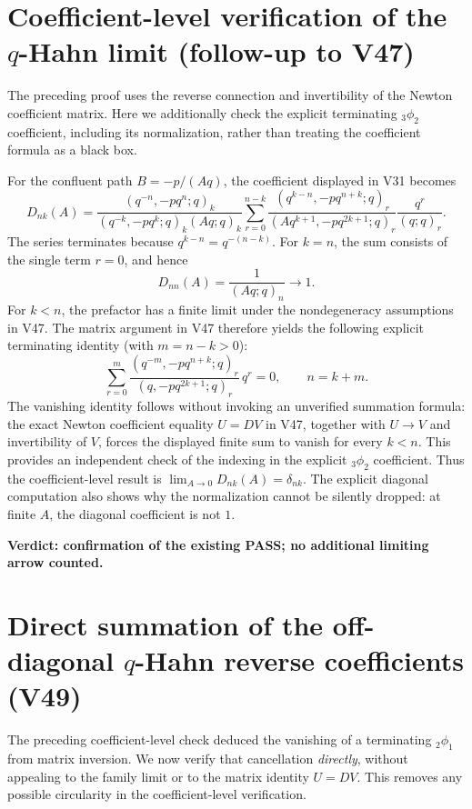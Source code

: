 \documentclass[11pt]{article}
\begin{document}
\section{Coefficient-level verification of the $q$-Hahn limit (follow-up to V47)}
The preceding proof uses the reverse connection and invertibility of the
Newton coefficient matrix. Here we additionally check the explicit
terminating ${}_3\phi_2$ coefficient, including its normalization, rather
than treating the coefficient formula as a black box.

For the confluent path $B=-p/(Aq)$, the coefficient displayed in V31 becomes
\[
D_{nk}(A)=\frac{(q^{-n},-pq^n;q)_k}
{(q^{-k},-pq^k;q)_k(Aq;q)_k}
\sum_{r=0}^{n-k}
\frac{(q^{k-n},-pq^{n+k};q)_r}
{(Aq^{k+1},-pq^{2k+1};q)_r}\frac{q^r}{(q;q)_r}.
\]
The series terminates because $q^{k-n}=q^{-(n-k)}$.
For $k=n$, the sum consists of the single term $r=0$, and hence
\[
\boxed{D_{nn}(A)=\frac1{(Aq;q)_n}\longrightarrow1.}
\]
For $k<n$, the prefactor has a finite limit under the nondegeneracy
assumptions in V47. The matrix argument in V47 therefore yields the
following explicit terminating identity (with $m=n-k>0$):
\[
\boxed{\sum_{r=0}^{m}
\frac{(q^{-m},-pq^{n+k};q)_r}
{(q,-pq^{2k+1};q)_r}\,q^r=0,\qquad n=k+m.}
\]
The vanishing identity follows without invoking an unverified
summation formula: the exact Newton coefficient equality $U=DV$ in V47,
together with $U\to V$ and invertibility of $V$, forces the displayed
finite sum to vanish for every $k<n$. This provides an independent
check of the indexing in the explicit ${}_3\phi_2$ coefficient.
Thus the coefficient-level result is $\lim_{A\to0}D_{nk}(A)=\delta_{nk}$.
The explicit diagonal computation also shows why the normalization cannot
be silently dropped: at finite $A$, the diagonal coefficient is not $1$.
\par\noindent\textbf{Verdict: confirmation of the existing PASS; no additional limiting arrow counted.}


\section{Direct summation of the off-diagonal $q$-Hahn reverse coefficients (V49)}
The preceding coefficient-level check deduced the vanishing of a terminating
${}_2\phi_1$ from matrix inversion. We now verify that cancellation
\emph{directly}, without appealing to the family limit or to the matrix
identity $U=DV$. This removes any possible circularity in the
coefficient-level verification.
\end{document}
